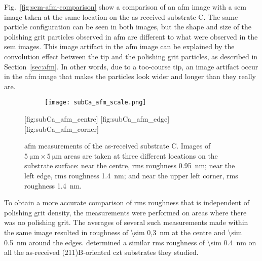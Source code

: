 Fig.~\ref{fig:sem-afm-comparison} show a comparison of an \ac{afm} image with a \ac{sem} image taken at the same location on the as-received substrate C. The same particle configuration can be seen in both images, but the shape and size of the polishing grit particles observed in \ac{afm} are different to what were observed in the \ac{sem} images. This image artifact in the \ac{afm} image can be explained by the convolution effect between the tip and the polishing grit particles, as described in Section~\ref{sec:afm}. In other words, due to a too-course tip, an image artifact occur in the \ac{afm} image that makes the particles look wider and longer than they really are. 

\begin{figure}[htbp]
    \centering
    \begin{subfigure}[c]{0.032\linewidth}
        \label{fig:subBa_afm_scale}\captionsetup{list=no}
        \texttt{[image: subCa\_afm\_scale.png]}
    \end{subfigure}
    \hfill
    [fig:subCa_afm_centre]%
    \hfill
    [fig:subCa_afm_edge]%
    \hfill
    [fig:subCa_afm_corner]%
    \caption[\Ac{afm} of as-received substrate C.]{\Ac{afm} measurements of the as-received substrate C. Images of $\SI{5}{\micro\metre}\times\SI{5}{\micro\metre}$ areas are taken at three different locations on the substrate surface:  near the centre, \ac{rms} roughness \SI{0.95}{\nano\metre};  near the left edge, \ac{rms} roughness \SI{1.4}{\nano\metre}; and  near the upper left corner, \ac{rms} roughness \SI{1.4}{\nano\metre}.}
    \label{fig:subCa_afm}
\end{figure} %

To obtain a more accurate comparison of \ac{rms} roughness that is independent of polishing grit density, the measurements were performed on areas where there was no polishing grit. The averages of several such measurements made within the same image resulted in  roughness of \SI{\sim 0,3}{\nano\metre} at the centre and \SI{\sim 0.5}{\nano\metre} around the edges. \citet{benson2015as-received} determined a similar \ac{rms} roughness of \SI{\sim 0.4}{\nano\metre} on all the as-received (211)B-oriented \ac{czt} substrates they studied.

